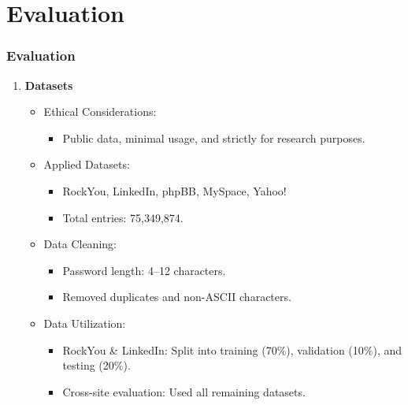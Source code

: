 \documentclass[
	12pt, %
]{beamer}
\begin{document}












\section{Evaluation}
\begin{frame}
	\frametitle{Evaluation}
	
	\begin{enumerate}
		\item \textbf{Datasets}
		\begin{itemize}
			\item Ethical Considerations:
			\begin{itemize}
				\item Public data, minimal usage, and strictly for research purposes.
			\end{itemize}
			
			\item Applied Datasets:
			\begin{itemize}
				\item RockYou, LinkedIn, phpBB, MySpace, Yahoo!
				\item Total entries: 75,349,874.
			\end{itemize}
			
			\item Data Cleaning:
			\begin{itemize}
				\item Password length: 4–12 characters.
				\item Removed duplicates and non-ASCII characters.
			\end{itemize}
			
			\item Data Utilization:
			\begin{itemize}
				\item RockYou \& LinkedIn: Split into training (70\%), validation (10\%), and testing (20\%).
				\item Cross-site evaluation: Used all remaining datasets.
			\end{itemize}
		\end{itemize}
	\end{enumerate}
\end{frame}
\end{document}
